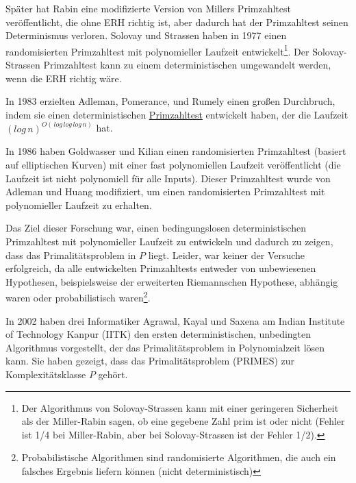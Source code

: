 \documentclass[12pt,oneside]{article}
\theoremstyle{remark}
\theoremstyle{definition}
\begin{document}
Später hat Rabin eine modifizierte Version von Millers Primzahltest veröffentlicht, die ohne ERH richtig ist, aber dadurch hat der Primzahltest seinen Determinismus verloren\cite{milRab}. Solovay und Strassen haben in 1977 \cite{solovay-strassen} einen randomisierten Primzahltest mit polynomieller Laufzeit entwickelt\footnote{Der Algorithmus von Solovay-Strassen kann mit einer geringeren Sicherheit als der Miller-Rabin sagen, ob eine gegebene Zahl prim ist oder nicht (Fehler ist 1/4 bei Miller-Rabin, aber bei Solovay-Strassen ist der Fehler 1/2).}. Der Solovay-Strassen Primzahltest kann zu einem deterministischen umgewandelt werden, wenn die ERH richtig wäre.

In 1983 erzielten Adleman, Pomerance, und Rumely einen großen Durchbruch, indem sie einen deterministischen \href{https://www.jstor.org/stable/2006975?seq=1}{Primzahltest} entwickelt haben, der die Laufzeit $(log \, n)^{O(\, log \, log \, log \, n)}$ hat.

In 1986 haben Goldwasser und Kilian einen randomisierten Primzahltest (basiert auf elliptischen Kurven) mit einer fast polynomiellen Laufzeit veröffentlicht (die Laufzeit ist nicht polynomiell für alle Inputs). Dieser Primzahltest wurde von Adleman und Huang modifiziert, um einen randomisierten Primzahltest mit polynomieller Laufzeit zu erhalten. 

Das Ziel dieser Forschung war, einen bedingungslosen deterministischen Primzahltest mit polynomieller Laufzeit zu entwickeln und dadurch zu zeigen, dass das Primalitätsproblem in $P$ liegt. Leider, war keiner der Versuche erfolgreich, da alle entwickelten Primzahltests entweder von unbewiesenen Hypothesen, beispielsweise der erweiterten Riemannschen Hypothese, abhängig waren oder probabilistisch waren\footnote{Probabilistische Algorithmen sind randomisierte Algorithmen, die auch ein falsches Ergebnis liefern können (nicht deterministisch)}.

In 2002 haben drei Informatiker Agrawal, Kayal und Saxena am Indian Institute of Technology Kanpur (IITK) den ersten deterministischen, unbedingten Algorithmus vorgestellt, der das Primalitätsproblem in Polynomialzeit lösen kann. Sie haben gezeigt, dass das Primalitätsproblem (PRIMES) zur Komplexitätsklasse $P$ gehört.\newline      

\newpage
\end{document}
